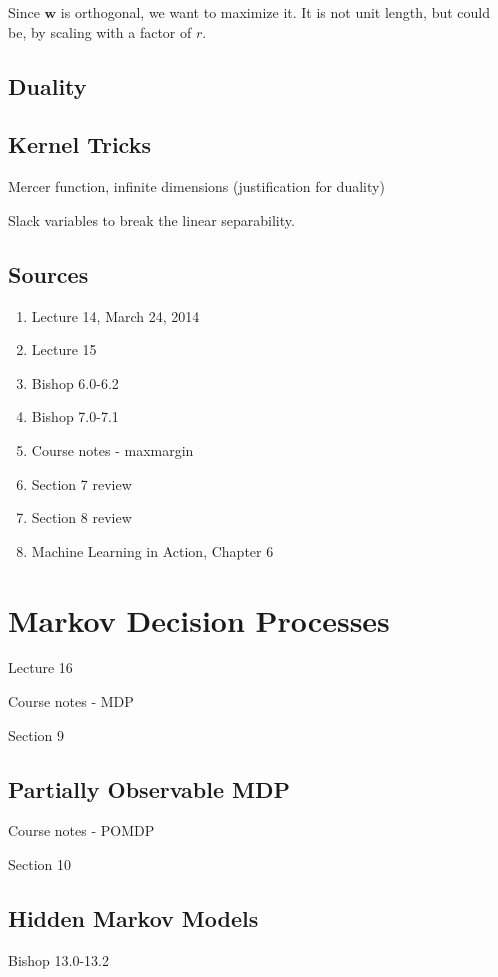 \documentclass[11pt, oneside]{article}   	%
\begin{document}
Since $\mathbf{w}$ is orthogonal, we want to maximize it. It is not unit length, but could be, by scaling with a factor of $r$.


\subsection {Duality}

\subsection {Kernel Tricks}
Mercer function, infinite dimensions (justification for duality)

Slack variables to break the linear separability.

\subsection{Sources}

\begin{enumerate}
	\item Lecture 14, March 24, 2014
	\item Lecture 15
	\item Bishop 6.0-6.2 
	\item Bishop 7.0-7.1
	\item Course notes - maxmargin
	\item Section 7 review
	\item Section 8 review
	\item Machine Learning in Action, Chapter 6
\end{enumerate}

\section{Markov Decision Processes}
Lecture 16

Course notes - MDP

Section 9

\subsection{Partially Observable MDP}
Course notes - POMDP

Section 10

\subsection{Hidden Markov Models}
Bishop 13.0-13.2
\end{document}
